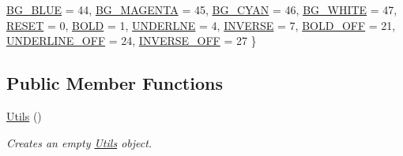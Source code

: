 \begin{DoxyCompactItemize}
\mbox{\hyperlink{classUtils_a32d52b4a749614335d60c2c3969b8df2a4b3dbf96f2aa0105ccaee7642a0b9c43}{B\+G\+\_\+\+B\+L\+UE}} = 44, 
\mbox{\hyperlink{classUtils_a32d52b4a749614335d60c2c3969b8df2ab40a0e2307f8eaf9045c3e7871a67c37}{B\+G\+\_\+\+M\+A\+G\+E\+N\+TA}} = 45, 
\mbox{\hyperlink{classUtils_a32d52b4a749614335d60c2c3969b8df2a98728a943fa0b495de3d0aafc6000943}{B\+G\+\_\+\+C\+Y\+AN}} = 46, 
\mbox{\hyperlink{classUtils_a32d52b4a749614335d60c2c3969b8df2a4294fd26d218c1fae6ac2d0fe0fb99a3}{B\+G\+\_\+\+W\+H\+I\+TE}} = 47, 
\newline
\mbox{\hyperlink{classUtils_a32d52b4a749614335d60c2c3969b8df2a12907a9ced1317d0c7ba02f2dbe0b6ec}{R\+E\+S\+ET}} = 0, 
\mbox{\hyperlink{classUtils_a32d52b4a749614335d60c2c3969b8df2a34a3c1317c33b3b51ada23abfb30d0c3}{B\+O\+LD}} = 1, 
\mbox{\hyperlink{classUtils_a32d52b4a749614335d60c2c3969b8df2a0cdd170af17e97c899264ba026990145}{U\+N\+D\+E\+R\+L\+NE}} = 4, 
\mbox{\hyperlink{classUtils_a32d52b4a749614335d60c2c3969b8df2a69b78b99d4b769427fc5bff4cd756353}{I\+N\+V\+E\+R\+SE}} = 7, 
\newline
\mbox{\hyperlink{classUtils_a32d52b4a749614335d60c2c3969b8df2a30a8134b5e0cce11651d7cefdda133f3}{B\+O\+L\+D\+\_\+\+O\+FF}} = 21, 
\mbox{\hyperlink{classUtils_a32d52b4a749614335d60c2c3969b8df2a175f014d51622f39f71f5a275e52ffa0}{U\+N\+D\+E\+R\+L\+I\+N\+E\+\_\+\+O\+FF}} = 24, 
\mbox{\hyperlink{classUtils_a32d52b4a749614335d60c2c3969b8df2acb9181d52a5eaa0e2f557896d42f4139}{I\+N\+V\+E\+R\+S\+E\+\_\+\+O\+FF}} = 27
 \}
\end{DoxyCompactItemize}
\subsection*{Public Member Functions}
\begin{DoxyCompactItemize}
\item 
\mbox{\label{classUtils_a452e78692c87ed5c7c993b6c6ac4981a}} 
\mbox{\hyperlink{classUtils_a452e78692c87ed5c7c993b6c6ac4981a}{Utils}} ()
\begin{DoxyCompactList}\small\item\em Creates an empty \mbox{\hyperlink{classUtils}{Utils}} object. \end{DoxyCompactList}\end{DoxyCompactItemize}
